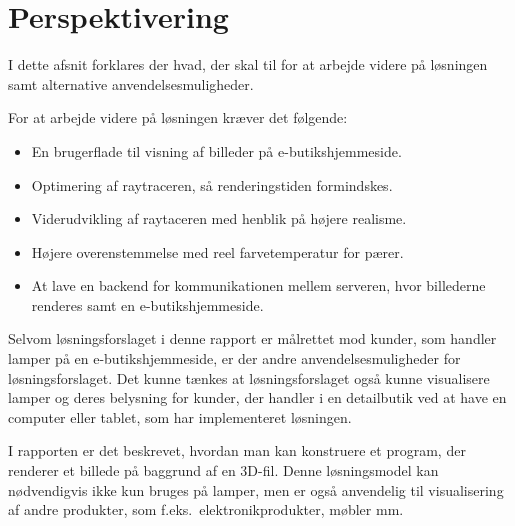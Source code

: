 \section{Perspektivering}
I dette afsnit forklares der hvad, der skal til for at arbejde videre på løsningen samt alternative anvendelsesmuligheder. 

For at arbejde videre på løsningen kræver det følgende:

\begin{itemize}
\item En brugerflade til visning af billeder på e-butikshjemmeside.
\item Optimering af raytraceren, så renderingstiden formindskes. 
\item Viderudvikling af raytaceren med henblik på højere realisme.
\item Højere overenstemmelse med reel farvetemperatur for pærer.  
\item At lave en backend for kommunikationen mellem serveren, hvor billederne renderes samt en e-butikshjemmeside.
\end{itemize}

Selvom løsningsforslaget i denne rapport er målrettet mod kunder, som handler lamper på en e-butikshjemmeside, er der andre anvendelsesmuligheder for løsningsforslaget. Det kunne tænkes at løsningsforslaget også kunne visualisere lamper og deres belysning for kunder, der handler i en detailbutik ved at have en computer eller tablet, som har implementeret løsningen. 

I rapporten er det beskrevet, hvordan man kan konstruere et program, der renderer et billede på baggrund af en 3D-fil. Denne løsningsmodel kan nødvendigvis ikke kun bruges på lamper, men er også anvendelig til visualisering af andre produkter, som f.eks.\ elektronikprodukter, møbler mm.

\clearpage